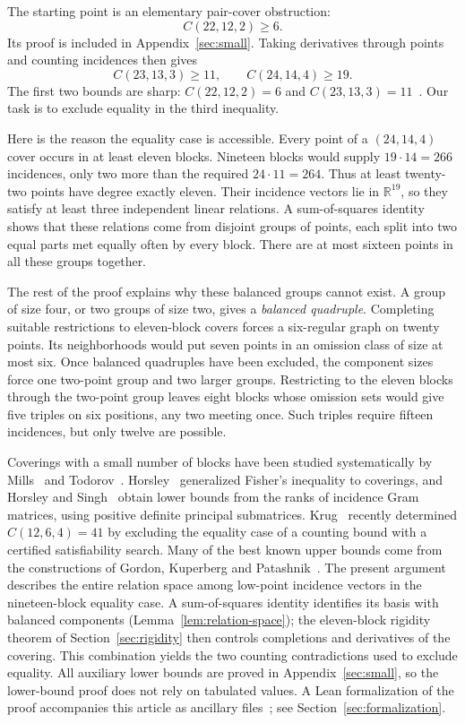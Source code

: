 \documentclass[11pt,letterpaper]{article}
\theoremstyle{definition}\newtheorem{definition}[theorem]{Definition}
\theoremstyle{remark}\newtheorem{remark}[theorem]{Remark}
\newcommand{\RR}{\mathbb R}
\begin{document}
The starting point is an elementary pair-cover obstruction:
\[
 C(22,12,2)\ge6.
\]
Its proof is included in Appendix~\ref{sec:small}. Taking derivatives through points and counting incidences then gives
\[
 C(23,13,3)\ge11,\qquad C(24,14,4)\ge19.
\]
The first two bounds are sharp: $C(22,12,2)=6$ and $C(23,13,3)=11$~\cite{LJCR,GordonStinson}. Our task is to exclude equality in the third inequality.

Here is the reason the equality case is accessible. Every point of a $(24,14,4)$ cover occurs in at least eleven blocks. Nineteen blocks would supply $19\cdot14=266$ incidences, only two more than the required $24\cdot11=264$. Thus at least twenty-two points have degree exactly eleven. Their incidence vectors lie in $\RR^{19}$, so they satisfy at least three independent linear relations. A sum-of-squares identity shows that these relations come from disjoint groups of points, each split into two equal parts met equally often by every block. There are at most sixteen points in all these groups together.

The rest of the proof explains why these balanced groups cannot exist. A group of size four, or two groups of size two, gives a \emph{balanced quadruple}. Completing suitable restrictions to eleven-block covers forces a six-regular graph on twenty points. Its neighborhoods would put seven points in an omission class of size at most six. Once balanced quadruples have been excluded, the component sizes force one two-point group and two larger groups. Restricting to the eleven blocks through the two-point group leaves eight blocks whose omission sets would give five triples on six positions, any two meeting once. Such triples require fifteen incidences, but only twelve are possible.

Coverings with a small number of blocks have been studied systematically by Mills~\cite{Mills} and Todorov~\cite{Todorov}. Horsley~\cite{Horsley} generalized Fisher's inequality to coverings, and Horsley and Singh~\cite{HorsleySingh} obtain lower bounds from the ranks of incidence Gram matrices, using positive definite principal submatrices. Krug~\cite{Krug} recently determined $C(12,6,4)=41$ by excluding the equality case of a counting bound with a certified satisfiability search. Many of the best known upper bounds come from the constructions of Gordon, Kuperberg and Patashnik~\cite{GKP}. The present argument describes the entire relation space among low-point incidence vectors in the nineteen-block equality case. A sum-of-squares identity identifies its basis with balanced components (Lemma~\ref{lem:relation-space}); the eleven-block rigidity theorem of Section~\ref{sec:rigidity} then controls completions and derivatives of the covering. This combination yields the two counting contradictions used to exclude equality. All auxiliary lower bounds are proved in Appendix~\ref{sec:small}, so the lower-bound proof does not rely on tabulated values. A Lean formalization of the proof accompanies this article as ancillary files~\cite{Formalization}; see Section~\ref{sec:formalization}.
\end{document}
